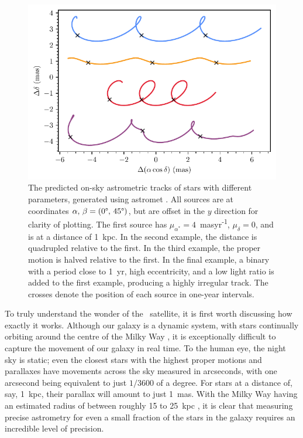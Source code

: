 \begin{figure}[tb]
	\includegraphics[width=\textwidth]{fig/c1/tracks.pdf}
	\caption[The predicted on-sky astrometric tracks of stars with different parameters]{The predicted on-sky astrometric tracks of stars with different parameters, generated using astromet \citep{penoyre_astrometric_2022}. All sources are at coordinates $\alpha,\,\beta=(0\degree,\,45\degree)$, but are offset in the $y$ direction for clarity of plotting. The first source has $\mu_{\alpha^*}=4$~masyr\textsuperscript{-1}, $\mu_{\delta}=0$, and is at a distance of 1~kpc. In the second example, the distance is quadrupled relative to the first. In the third example, the proper motion is halved relative to the first. In the final example, a binary with a period close to 1~yr, high eccentricity, and a low light ratio is added to the first example, producing a highly irregular track. The crosses denote the position of each source in one-year intervals.}
	\label{fig:intro:history:gaia_tracks}
\end{figure}

To truly understand the wonder of the \gaia\ satellite, it is first worth discussing how exactly it works. Although our galaxy is a dynamic system, with stars continually orbiting around the centre of the Milky Way \citep{binney_galactic_1987}, it is exceptionally difficult to capture the movement of our galaxy in real time. To the human eye, the night sky is static; even the closest stars with the highest proper motions and parallaxes have movements across the sky measured in arcseconds, with one arcsecond being equivalent to just $1/3600$ of a degree. For stars at a distance of, say, 1~kpc, their parallax will amount to just 1~mas. With the Milky Way having an estimated radius of between roughly 15 to 25~kpc \citep{lopez-corredoira_disk_stars_2018}, it is clear that measuring precise astrometry for even a small fraction of the stars in the galaxy requires an incredible level of precision.

